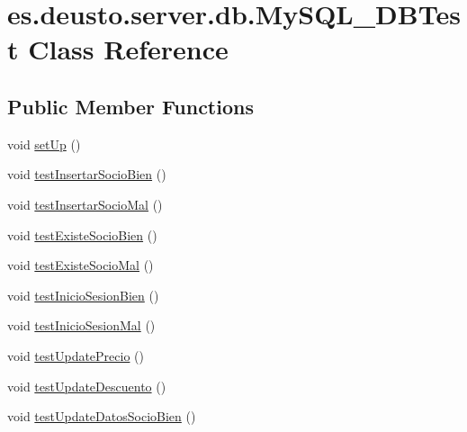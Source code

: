 \hypertarget{classes_1_1deusto_1_1server_1_1db_1_1_my_s_q_l___d_b_test}{}\section{es.\+deusto.\+server.\+db.\+My\+S\+Q\+L\+\_\+\+D\+B\+Test Class Reference}
\label{classes_1_1deusto_1_1server_1_1db_1_1_my_s_q_l___d_b_test}
\subsection*{Public Member Functions}
\begin{DoxyCompactItemize}
\item 
void \mbox{\hyperlink{classes_1_1deusto_1_1server_1_1db_1_1_my_s_q_l___d_b_test_a67348545b8b76e0638185a4673f3a76b}{set\+Up}} ()
\item 
void \mbox{\hyperlink{classes_1_1deusto_1_1server_1_1db_1_1_my_s_q_l___d_b_test_ad4503f5a857b3acee96227dd8e76c86d}{test\+Insertar\+Socio\+Bien}} ()
\item 
void \mbox{\hyperlink{classes_1_1deusto_1_1server_1_1db_1_1_my_s_q_l___d_b_test_ab0f19454d8595f9159c9d18903d03397}{test\+Insertar\+Socio\+Mal}} ()
\item 
void \mbox{\hyperlink{classes_1_1deusto_1_1server_1_1db_1_1_my_s_q_l___d_b_test_a683755b64944ce334982278f005d8bd5}{test\+Existe\+Socio\+Bien}} ()
\item 
void \mbox{\hyperlink{classes_1_1deusto_1_1server_1_1db_1_1_my_s_q_l___d_b_test_a8f54a5287c3a9ee17b7553bbdaceaa83}{test\+Existe\+Socio\+Mal}} ()
\item 
void \mbox{\hyperlink{classes_1_1deusto_1_1server_1_1db_1_1_my_s_q_l___d_b_test_aa40e28320e6613d25d7e6ad771e48ff6}{test\+Inicio\+Sesion\+Bien}} ()
\item 
void \mbox{\hyperlink{classes_1_1deusto_1_1server_1_1db_1_1_my_s_q_l___d_b_test_a01bc97302a64131876562b8428112944}{test\+Inicio\+Sesion\+Mal}} ()
\item 
void \mbox{\hyperlink{classes_1_1deusto_1_1server_1_1db_1_1_my_s_q_l___d_b_test_adb0535409018f97c00bbf1456e33df32}{test\+Update\+Precio}} ()
\item 
void \mbox{\hyperlink{classes_1_1deusto_1_1server_1_1db_1_1_my_s_q_l___d_b_test_a5ab9435dba36e81a00a01041195be48c}{test\+Update\+Descuento}} ()
\item 
void \mbox{\hyperlink{classes_1_1deusto_1_1server_1_1db_1_1_my_s_q_l___d_b_test_aa4c05874f3736948fb2f94935e202926}{test\+Update\+Datos\+Socio\+Bien}} ()

\end{DoxyCompactItemize}
